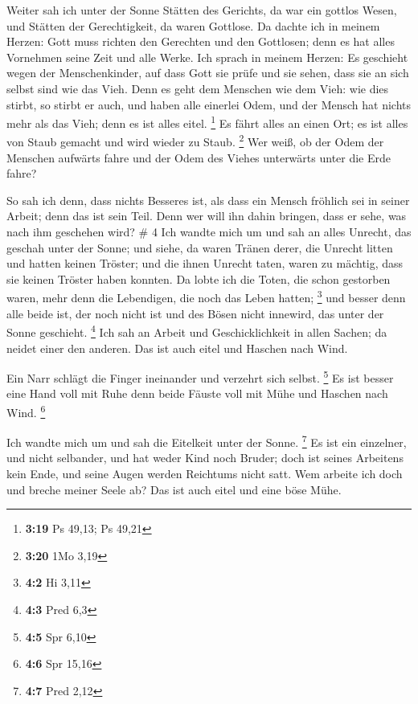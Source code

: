  Weiter sah ich unter der Sonne Stätten des Gerichts, da
war ein gottlos Wesen, und Stätten der Gerechtigkeit, da waren Gottlose.
 Da dachte ich in meinem Herzen: Gott muss richten den
Gerechten und den Gottlosen; denn es hat alles Vornehmen seine Zeit und
alle Werke.  Ich sprach in meinem Herzen: Es geschieht
wegen der Menschenkinder, auf dass Gott sie prüfe und sie sehen, dass
sie an sich selbst sind wie das Vieh.  Denn es geht dem
Menschen wie dem Vieh: wie dies stirbt, so stirbt er auch, und haben
alle einerlei Odem, und der Mensch hat nichts mehr als das Vieh; denn es
ist alles eitel. \footnote{\textbf{3:19} Ps 49,13; Ps 49,21}
 Es fährt alles an einen Ort; es ist alles von Staub
gemacht und wird wieder zu Staub. \footnote{\textbf{3:20} 1Mo 3,19}
 Wer weiß, ob der Odem der Menschen aufwärts fahre und
der Odem des Viehes unterwärts unter die Erde fahre?

 So sah ich denn, dass nichts Besseres ist, als dass ein
Mensch fröhlich sei in seiner Arbeit; denn das ist sein Teil. Denn wer
will ihn dahin bringen, dass er sehe, was nach ihm geschehen wird? \# 4
 Ich wandte mich um und sah an alles Unrecht, das geschah
unter der Sonne; und siehe, da waren Tränen derer, die Unrecht litten
und hatten keinen Tröster; und die ihnen Unrecht taten, waren zu
mächtig, dass sie keinen Tröster haben konnten.  Da lobte
ich die Toten, die schon gestorben waren, mehr denn die Lebendigen, die
noch das Leben hatten; \footnote{\textbf{4:2} Hi 3,11} 
und besser denn alle beide ist, der noch nicht ist und des Bösen nicht
innewird, das unter der Sonne geschieht. \footnote{\textbf{4:3} Pred 6,3}
 Ich sah an Arbeit und Geschicklichkeit in allen Sachen;
da neidet einer den anderen. Das ist auch eitel und Haschen nach Wind.

 Ein Narr schlägt die Finger ineinander und verzehrt sich
selbst. \footnote{\textbf{4:5} Spr 6,10}  Es ist besser
eine Hand voll mit Ruhe denn beide Fäuste voll mit Mühe und Haschen nach
Wind. \footnote{\textbf{4:6} Spr 15,16}

 Ich wandte mich um und sah die Eitelkeit unter der Sonne.
\footnote{\textbf{4:7} Pred 2,12}  Es ist ein einzelner,
und nicht selbander, und hat weder Kind noch Bruder; doch ist seines
Arbeitens kein Ende, und seine Augen werden Reichtums nicht satt. Wem
arbeite ich doch und breche meiner Seele ab? Das ist auch eitel und eine
böse Mühe.

